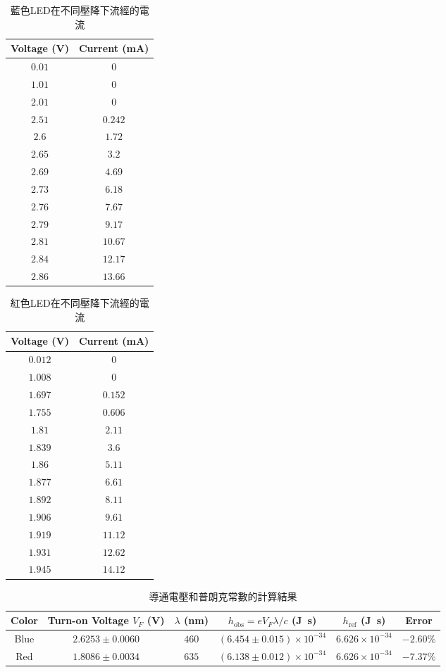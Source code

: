 \begin{table}[htb!]
\centering
\caption{藍色LED在不同壓降下流經的電流}
\begin{tabular}{cc}
\toprule
Voltage (\unit{\V}) & Current (\unit{\mA}) \\
\midrule
$0.01$ & $0$ \\
$1.01$ & $0$ \\
$2.01$ & $0$ \\
$2.51$ & $0.242$ \\
$2.6$ & $1.72$ \\
$2.65$ & $3.2$ \\
$2.69$ & $4.69$ \\
$2.73$ & $6.18$ \\
$2.76$ & $7.67$ \\
$2.79$ & $9.17$ \\
$2.81$ & $10.67$ \\
$2.84$ & $12.17$ \\
$2.86$ & $13.66$ \\
\bottomrule
\end{tabular}
\end{table}
\begin{table}[htb!]
\centering
\caption{紅色LED在不同壓降下流經的電流}
\begin{tabular}{cc}
\toprule
Voltage (\unit{\V}) & Current (\unit{\mA}) \\
\midrule
$0.012$ & $0$ \\
$1.008$ & $0$ \\
$1.697$ & $0.152$ \\
$1.755$ & $0.606$ \\
$1.81$ & $2.11$ \\
$1.839$ & $3.6$ \\
$1.86$ & $5.11$ \\
$1.877$ & $6.61$ \\
$1.892$ & $8.11$ \\
$1.906$ & $9.61$ \\
$1.919$ & $11.12$ \\
$1.931$ & $12.62$ \\
$1.945$ & $14.12$ \\
\bottomrule
\end{tabular}
\end{table}
\begin{table}[htb!]
\centering
\caption{導通電壓和普朗克常數的計算結果}
\begin{tabular}{cccccc}
\toprule
Color & Turn-on Voltage $V_F$ (\unit{\V}) & $\lambda$ (\unit{\nm}) & $h_{\text{obs}}=eV_F\lambda/c$ (\unit{\J\s}) & $h_{\text{ref}}$ (\unit{\J\s}) & Error \\
\midrule
Blue & $2.6253 \pm 0.0060$ & $460$ & $(6.454 \pm 0.015)\times 10^{-34}$ & $6.626\times 10^{-34}$ & $-2.60\%$ \\
Red & $1.8086 \pm 0.0034$ & $635$ & $(6.138 \pm 0.012)\times 10^{-34}$ & $6.626\times 10^{-34}$ & $-7.37\%$ \\
\bottomrule
\end{tabular}
\end{table}

